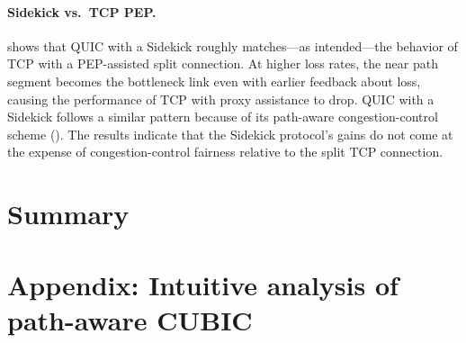 \paragraph{Sidekick vs.\ TCP PEP\@.}
 shows that QUIC with a Sidekick roughly matches---as
 intended---the behavior of TCP with a PEP-assisted split connection. At higher
loss rates, the near path segment becomes the bottleneck link even with earlier
feedback about loss, causing the performance of TCP with proxy assistance to
drop. QUIC with a Sidekick follows a similar pattern because of its path-aware
congestion-control scheme (). The
results indicate that the Sidekick protocol's gains do not come at the expense
of congestion-control fairness relative to the split TCP connection.

\section{Summary}
\label{sec:sidekick:summary}

\section{Appendix: Intuitive analysis of path-aware CUBIC}
\label{sec:sidekick:appendix}

